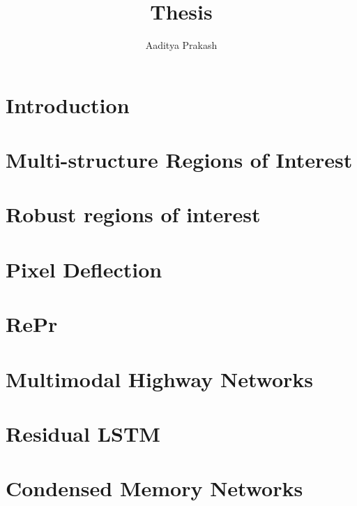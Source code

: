 \documentclass{brandeis-dissertationx}
\title{Thesis}
\author{Aaditya Prakash}
\begin{document}
\acknowledgments{}
\preface{}
\signaturepage*
\thesisfront[nocopyrightpage]




\listoffigures
\listoftables
\listofalgorithms



\chapter{Introduction}


\chapter{Multi-structure Regions of Interest}


\chapter{Robust regions of interest}


\chapter{Pixel Deflection}


\chapter{RePr}


\chapter{Multimodal Highway Networks}


\chapter{Residual LSTM}


\chapter{Condensed Memory Networks}


\printbibliography
\end{document}

